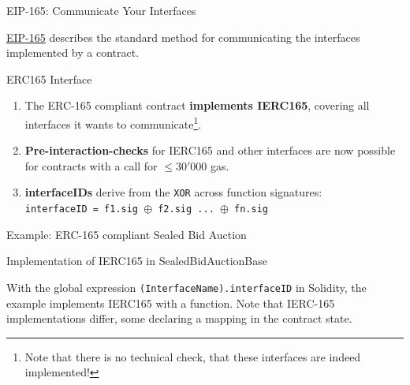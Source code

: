 \documentclass[]{beamer}
\begin{document}
\begin{frame}{EIP-165: Communicate Your Interfaces}

\link \href{https://eips.ethereum.org/EIPS/eip-165}{EIP-165} describes the standard method for communicating the interfaces implemented by a contract. 

\begin{samplecode}{ERC165 Interface}
		
\end{samplecode}

\begin{enumerate}
	\item	The ERC-165 compliant contract \textbf{implements IERC165}, covering all interfaces it wants to communicate\footnote{Note that there is no technical check, that these interfaces are indeed implemented!}.
	\item	\textbf{Pre-interaction-checks} for IERC165 and other interfaces are now possible for contracts with a call for $\leq 30'000$ gas.
	\item	\textbf{interfaceIDs} derive from the \texttt{XOR} across function signatures:\\
			\color{darkmint} \texttt{interfaceID = f1.sig $\oplus$ f2.sig ... $\oplus$ fn.sig}
\end{enumerate}

\end{frame}

\begin{frame}{Example: ERC-165 compliant Sealed Bid Auction}

\begin{samplecode}{Implementation of IERC165 in SealedBidAuctionBase}
		
\end{samplecode}

\footnotesize{With the global expression \texttt{(InterfaceName).interfaceID} in Solidity, the example implements IERC165 with a  function. Note that IERC-165 implementations differ, some declaring a mapping in the contract state. }

\end{frame}
\end{document}
